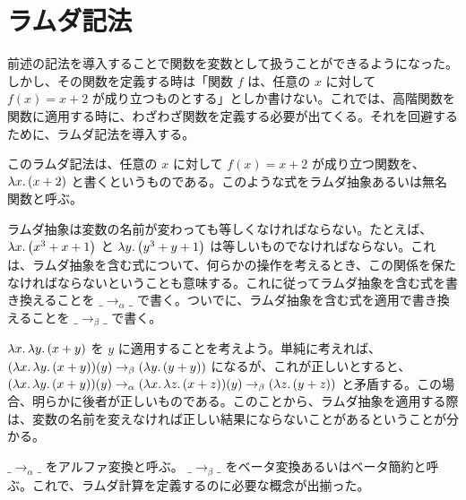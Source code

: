 \documentclass[book]{jlreq}
\newcommand{\p}[1]{ \mathord{ \left( #1 \right) } }
\begin{document}
\section{ラムダ記法}

前述の記法を導入することで関数を変数として扱うことができるようになった。しかし、その関数を定義する時は「関数 \( f \) は、任意の \( x \) に対して \( f \p{ x } = x + 2 \) が成り立つものとする」としか書けない。これでは、高階関数を関数に適用する時に、わざわざ関数を定義する必要が出てくる。それを回避するために、ラムダ記法を導入する。

このラムダ記法は、任意の \( x \) に対して \( f \p{ x } = x + 2 \) が成り立つ関数を、 \( \lambda x \ldotp \p{ x + 2 } \) と書くというものである。このような式をラムダ抽象あるいは無名関数と呼ぶ。

ラムダ抽象は変数の名前が変わっても等しくなければならない。たとえば、 \( \lambda x \ldotp \p{ x^3 + x + 1 } \) と \( \lambda y \ldotp \p{ y^3 + y + 1 } \) は等しいものでなければならない。これは、ラムダ抽象を含む式について、何らかの操作を考えるとき、この関係を保たなければならないということも意味する。これに従ってラムダ抽象を含む式を書き換えることを \( \_ \rightarrow_\alpha \_ \) で書く。ついでに、ラムダ抽象を含む式を適用で書き換えることを \( \_ \rightarrow_\beta \_ \) で書く。

\( \lambda x \ldotp \lambda y \ldotp \p{ x + y } \) を \( y \) に適用することを考えよう。単純に考えれば、 \( \p{ \lambda x \ldotp \lambda y \ldotp \p{ x + y } } \p{ y } \rightarrow_\beta \p{ \lambda y \ldotp \p{ y + y } } \) になるが、これが正しいとすると、 \( \p{ \lambda x \ldotp \lambda y \ldotp \p{ x + y } } \p{ y } \rightarrow_\alpha \p{ \lambda x \ldotp \lambda z \ldotp \p{ x + z } } \p{ y } \rightarrow_\beta \p{ \lambda z \ldotp \p{ y + z } } \) と矛盾する。この場合、明らかに後者が正しいものである。このことから、ラムダ抽象を適用する際は、変数の名前を変えなければ正しい結果にならないことがあるということが分かる。

\( \_ \rightarrow_\alpha \_ \) をアルファ変換と呼ぶ。 \( \_ \rightarrow_\beta \_ \) をベータ変換あるいはベータ簡約と呼ぶ。これで、ラムダ計算を定義するのに必要な概念が出揃った。
\end{document}
